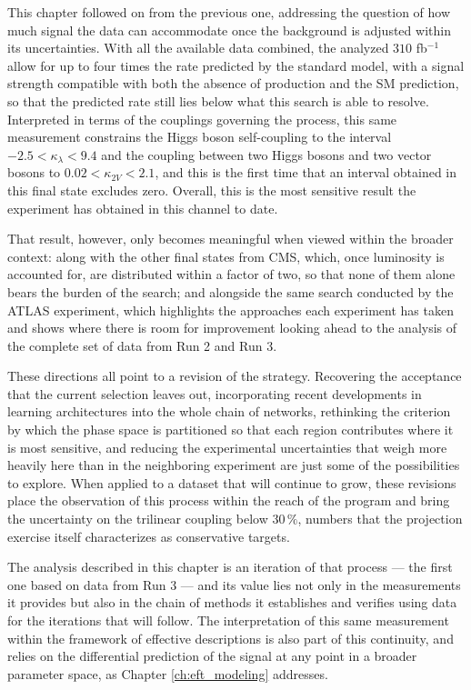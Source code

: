 This chapter followed on from the previous one, addressing the question of how much signal the data can accommodate once the background is adjusted within its uncertainties. With all the available data combined, the analyzed $310$ fb$^{-1}$ allow for up to four times the rate predicted by the standard model, with a signal strength compatible with both the absence of production and the SM prediction, so that the predicted rate still lies below what this search is able to resolve. Interpreted in terms of the couplings governing the process, this same measurement constrains the Higgs boson self-coupling to the interval $-2.5 < \kappa_\lambda < 9.4$ and the coupling between two Higgs bosons and two vector bosons to $0.02 < \kappa_{2V} < 2.1$, and this is the first time that an interval obtained in this final state excludes zero. Overall, this is the most sensitive result the experiment has obtained in this channel to date.

That result, however, only becomes meaningful when viewed within the broader context: along with the other final states from CMS, which, once luminosity is accounted for, are distributed within a factor of two, so that none of them alone bears the burden of the search; and alongside the same search conducted by the ATLAS experiment, which highlights the approaches each experiment has taken and shows where there is room for improvement looking ahead to the analysis of the complete set of data from Run 2 and Run 3.

These directions all point to a revision of the strategy. Recovering the acceptance that the current selection leaves out, incorporating recent developments in learning architectures into the whole chain of networks, rethinking the criterion by which the phase space is partitioned so that each region contributes where it is most sensitive, and reducing the experimental uncertainties that weigh more heavily here than in the neighboring experiment are just some of the possibilities to explore. When applied to a dataset that will continue to grow, these revisions place the observation of this process within the reach of the program and bring the uncertainty on the trilinear coupling below $30\,\%$, numbers that the projection exercise itself characterizes as conservative targets.


The analysis described in this chapter is an iteration of that process — the first one based on data from Run 3 — and its value lies not only in the measurements it provides but also in the chain of methods it establishes and verifies using data for the iterations that will follow. The interpretation of this same measurement within the framework of effective descriptions is also part of this continuity, and relies on the differential prediction of the signal at any point in a broader parameter space, as Chapter \ref{ch:eft_modeling} addresses.




